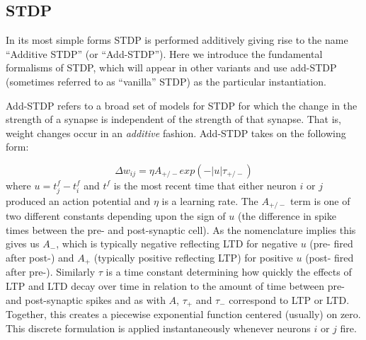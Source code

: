\subsection{STDP}

In its most simple forms STDP is performed additively giving rise to the name ``Additive STDP'' (or ``Add-STDP''). Here we introduce the fundamental formalisms of STDP, which will appear in other variants and use add-STDP (sometimes referred to as ``vanilla'' STDP) as the particular instantiation.

Add-STDP refers to a broad set of models for STDP for which the change in the strength of a synapse is independent of the strength of that synapse. That is, weight changes occur in an \emph{additive} fashion. Add-STDP takes on the following form:

\begin{equation*}
\Delta w_{ij}  = \eta A_{+/-} exp(-|u| \tau_{+/-})
\end{equation*}
where $u = t^f_j-t^f_i$ and $t^f$ is the most recent time that either neuron $i$ or $j$ produced an action potential and $\eta$ is a learning rate. The $A_{+/-}$ term is one of two different constants depending upon the sign of $u$ (the difference in spike times between the pre- and post-synaptic cell). As the nomenclature implies this gives us $A_-$, which is typically negative reflecting LTD for negative $u$ (pre- fired after post-) and $A_+$ (typically positive reflecting LTP) for positive $u$ (post- fired after pre-). Similarly $\tau$ is a time constant determining how quickly the effects of LTP and LTD decay over time in relation to the amount of time between pre- and post-synaptic spikes and as with $A$, $\tau_+$ and $\tau_-$ correspond to LTP or LTD. Together, this creates a piecewise exponential function centered (usually) on zero. This discrete formulation is applied instantaneously whenever neurons $i$ or $j$ fire.




